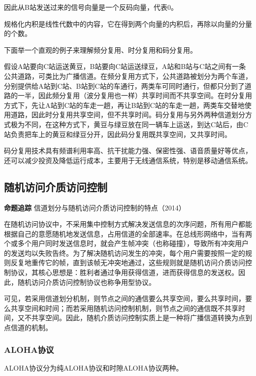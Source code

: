 \documentclass{ctexbook}
\begin{document}
	因此从B站发送过来的信号向量是一个反码向量，代表0。
	
	规格化内积是线性代数中的内容，它在得到两个向量的内积后，再除以向量的分量的个数。
	
	下面举一个直观的例子来理解频分复用、时分复用和码分复用。
	
	假设A站要向C站运送黄豆，B站要向C站运送绿豆，A站和B站与C站之间有一条公共道路，可类比为广播信道。在频分复用方式下，公共道路被划分为两个车道，分别提供给A站到C站、B站到C站的车通行，两类车可同时通行，但都只分到了道路的一半，因此频分复用（波分复用也一样）共享时间而不共享空间。在时分复用方式下，先让A站到C站的车走一趟，再让B站到C站的车走一趟，两类车交替地使用道路，因此时分复用共享空间，但不共享时间。码分复用与另外两种信道划分方式极为不同，在这种方式下，黄豆与绿豆放在同一辆车上运送，到达C站后，由C站负责把车上的黄豆和绿豆分开，因此码分复用既共享空间，又共享时间。
	
	码分复用技术具有频谱利用率高、抗干扰能力强、保密性强、语音质量好等优点，还可以减少投资及降低运行成本，主要用于无线通信系统，特别是移动通信系统。
	
	\subsection{随机访问介质访问控制}
	\begin{tcolorbox}[colframe=black, colback=white]
		\kaishu \textbf{命题追踪} \quad 信道划分与随机访问介质访问控制的特点（2014）
	\end{tcolorbox}
	
	在随机访问协议中，不采用集中控制方式解决发送信息的次序问题，所有用户都能根据自己的意愿随机地发送信息，占用信道的全部速率。在总线形网络中，当有两个或多个用户同时发送信息时，就会产生帧冲突（也称碰撞），导致所有冲突用户的发送均以失败告终。为了解决随机访问发生的冲突，每个用户需要按照一定的规则反复地重传它的帧，直到该帧无冲突地通过，这些规则就是随机访问介质访问控制协议，其核心思想是：胜利者通过争用获得信道，进而获得信息的发送权。因此，随机访问介质访问控制协议也称争用型协议。
	
	可见，若采用信道划分机制，则节点之间的通信要么共享空间，要么共享时间，要么共享空间和时间；而若采用随机访问控制机制，则节点之间的通信既不共享时间，又不共享空间。因此，随机介质访问控制实质上是一种将广播信道转换为点到点信道的机制。
	
	\subsubsection{ALOHA协议}
	
	ALOHA协议分为纯ALOHA协议和时隙ALOHA协议两种。
	
\end{document}

